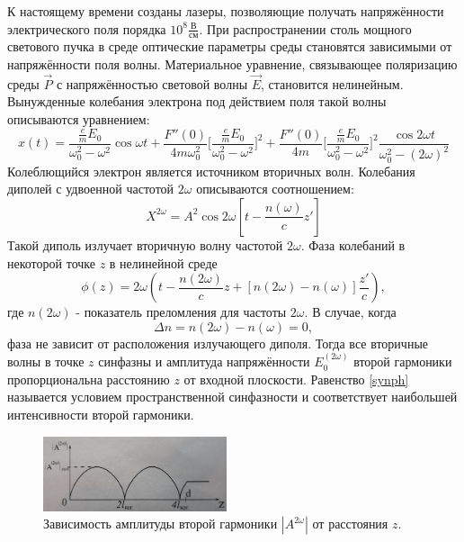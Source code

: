 \documentclass[12pt]{article}
\begin{document}
\hspace{0.5cm}
К настоящему времени созданы лазеры, позволяющие получать напряжённости электрического поля порядка $10^{8}\frac{\text{В}}{\text{см}}$. При распространении столь мощного светового пучка в среде оптические параметры среды становятся зависимыми от напряжённости поля волны. Материальное уравнение, связывающее поляризацию среды $\vec{P}$ с напряжённостью световой волны $\vec{E}$, становится нелинейным. Вынужденные колебания электрона под действием поля такой волны описываются уравнением:
\begin{equation}
x(t) = \frac{\frac{e}{m}E_0}{\omega_0^2-\omega^2}\cos{\omega t}+\frac{F''(0)}{4m\omega_0^2}\bigg[\frac{\frac{e}{m}E_0}{\omega_0^2-\omega^2}\bigg]^2+\frac{F''(0)}{4m}\bigg[\frac{\frac{e}{m}E_0}{\omega_0^2-\omega^2}\bigg]^2\frac{\cos{2\omega t}}{\omega_0^2-(2\omega)^2}
\end{equation}
\hspace{0.5cm}
Колеблющийся электрон является источником вторичных волн. Колебания диполей с удвоенной частотой $2\omega$ описываются соотношением:
\begin{equation}
X^{2\omega} = A^2\cos{2\omega}\left[t-\frac{n(\omega)}{c}z'\right]
\end{equation}
\hspace{0.5cm}
Такой диполь излучает вторичную волну частотой $2\omega$. Фаза колебаний в некоторой точке $z$ в нелинейной среде
\begin{equation}
\phi(z) = 2\omega(t-\frac{n(2\omega)}{c}z+[n(2\omega)-n(\omega)]\frac{z'}{c}),
\end{equation}
где $n(2\omega)$ - показатель преломления для частоты $2\omega$. В случае, когда
\begin{equation}
\label{synph}
\Delta n = n(2\omega) - n(\omega) = 0,
\end{equation}
фаза не зависит от расположения излучающего диполя. Тогда все вторичные волны в точке $z$ синфазны и амплитуда напряжённости $E_{0}^{(2\omega)}$ второй гармоники пропорциональна расстоянию $z$ от входной плоскости. Равенство \ref{synph} называется условием пространственной синфазности и соответствует наибольшей интенсивности второй гармоники.
\begin{figure}
  \begin{center}
    \includegraphics[width=0.48\textwidth]{pic1.png}
  \end{center}
  \caption{Зависимость амплитуды второй гармоники $|A^{2\omega}|$ от расстояния $z$.}
  \label{pic1}
\end{figure}
\end{document}
